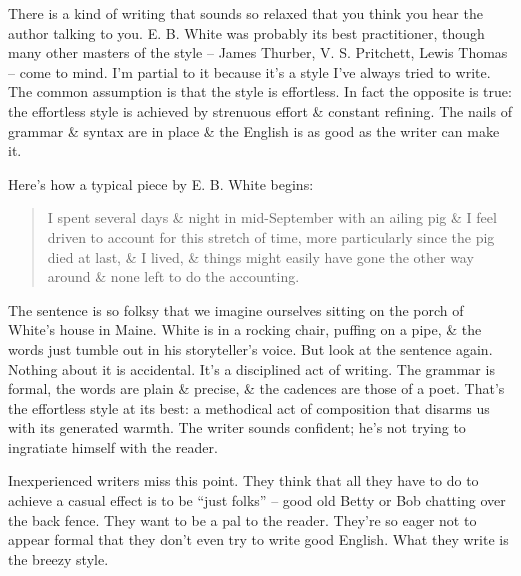 \documentclass{article}
\numberwithin{equation}{section}
\begin{document}
There is a kind of writing that sounds so relaxed that you think you hear the author talking to you. E. B. White was probably its best practitioner, though many other masters of the style -- James Thurber, V. S. Pritchett, Lewis Thomas -- come to mind. I'm partial to it because it's a style I've always tried to write. The common assumption is that the style is effortless. In fact the opposite is true: the effortless style is achieved by strenuous effort \& constant refining. The nails of grammar \& syntax are in place \& the English is as good as the writer can make it.

Here's how a typical piece by E. B. White begins:
\begin{quotation}
	I spent several days \& night in mid-September with an ailing pig \& I feel driven to account for this stretch of time, more particularly since the pig died at last, \& I lived, \& things might easily have gone the other way around \& none left to do the accounting.
\end{quotation}
The sentence is so folksy that we imagine ourselves sitting on the porch of White's house in Maine. White is in a rocking chair, puffing on a pipe, \& the words just tumble out in his storyteller's voice. But look at the sentence again. Nothing about it is accidental. It's a disciplined act of writing. The grammar is formal, the words are plain \& precise, \& the cadences are those of a poet. That's the effortless style at its best: a methodical act of composition that disarms us with its generated warmth. The writer sounds confident; he's not trying to ingratiate himself with the reader.

Inexperienced writers miss this point. They think that all they have to do to achieve a casual effect is to be ``just folks'' -- good old Betty or Bob chatting over the back fence. They want to be a pal to the reader. They're so eager not to appear formal that they don't even try to write good English. What they write is the breezy style.
\end{document}
